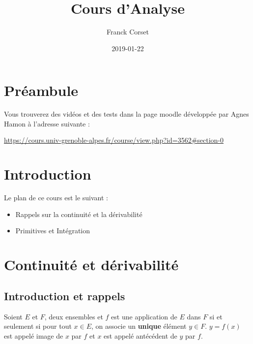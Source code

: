 \documentclass[]{book}
\title{Cours d'Analyse}
\author{Franck Corset}
\date{2019-01-22}
\theoremstyle{definition}
\theoremstyle{definition}
\theoremstyle{definition}
\theoremstyle{remark}
\let\BeginKnitrBlock\begin \let\EndKnitrBlock\end
\begin{document}
\maketitle

{
\setcounter{tocdepth}{1}
\tableofcontents
}
\hypertarget{preambule}{%
\chapter{Préambule}\label{preambule}}

Vous trouverez des vidéos et des tests dans la page moodle développée par Agnes Hamon à l'adresse suivante :

\url{https://cours.univ-grenoble-alpes.fr/course/view.php?id=3562\#section-0}

\hypertarget{intro}{%
\chapter{Introduction}\label{intro}}

Le plan de ce cours est le suivant :

\begin{itemize}
\item
  Rappels sur la continuité et la dérivabilité
\item
  Primitives et Intégration
\end{itemize}

\hypertarget{continuite-et-derivabilite}{%
\chapter{Continuité et dérivabilité}\label{continuite-et-derivabilite}}

\hypertarget{introduction-et-rappels}{%
\section{Introduction et rappels}\label{introduction-et-rappels}}

\begin{quote}
\end{quote}

\BeginKnitrBlock{definition}[Application]
\protect\hypertarget{def:unnamed-chunk-1}{}{\label{def:unnamed-chunk-1} \iffalse (Application) \fi{} }Soient \(E\) et \(F\), deux ensembles et \(f\) est une application de \(E\) dans \(F\) si et seulement si pour tout \(x\in E\), on associe un \textbf{unique} élément \(y\in F\). \(y=f(x)\) est appelé image de \(x\) par \(f\) et \(x\) est appelé antécédent de \(y\) par \(f\).
\EndKnitrBlock{definition}
\end{document}
